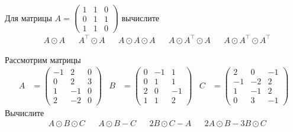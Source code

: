 \begin{exercise}
Для матрицы \(A=\begin{pmatrix} 1 & 1 & 0 \\ 0 & 1 & 1 \\ 1 & 1 & 0 \end{pmatrix}\) вычислите
\begin{align*}
	&A\odot A & &A^\top\odot A & &A\odot A\odot A & &A\odot A^\top\odot A & &A\odot A^\top\odot A^\top
\end{align*}
\end{exercise}

\begin{exercise}
Рассмотрим матрицы
\begin{align*}
	A&=\begin{pmatrix}
		-1 & 2 & 0 \\ 0 & 2 & 3 \\ 1 & -1 & 0 \\ 2 & -2 & 0
	\end{pmatrix} &
	B&=\begin{pmatrix}
		0 & -1 & 1 \\ 0 & 1 & 1 \\ 2 & 0 & -1 \\ 1 & 1 & 2
	\end{pmatrix} &
	C&=\begin{pmatrix}
		2 & 0 & -1 \\ -1 & -2 & 2 \\ 1 & -1& 2 \\ 0 & 3 & -1
	\end{pmatrix}
\end{align*}
Вычислите
\begin{align*}
	& A\odot B\odot C & &A\odot B-C & &2B\odot C-A& &2A\odot B-3B\odot C
\end{align*}
\end{exercise}

